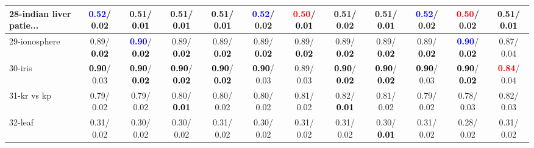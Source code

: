 \begin{table}[h]
\begin{center}
{\begin{tabular}{lc|c|c|c|c|c|c|c|c|c|c}
28-indian liver patie... & \textcolor{blue}{\textbf{  0.52}}/  0.02 &   0.51/\textcolor{black}{\textbf{  0.01}} &   0.51/\textcolor{black}{\textbf{  0.01}} &   0.51/\textcolor{black}{\textbf{  0.01}} & \textcolor{blue}{\textbf{  0.52}}/  0.02 & \textcolor{red}{\textbf{  0.50}}/\textcolor{black}{\textbf{  0.01}} &   0.51/  0.02 &   0.51/\textcolor{black}{\textbf{  0.01}} & \textcolor{blue}{\textbf{  0.52}}/  0.02 & \textcolor{red}{\textbf{  0.50}}/  0.02 &   0.51/\textcolor{black}{\textbf{  0.01}} \\ \hline
29-ionosphere &   0.89/\textcolor{black}{\textbf{  0.02}} & \textcolor{blue}{\textbf{  0.90}}/\textcolor{black}{\textbf{  0.02}} &   0.89/\textcolor{black}{\textbf{  0.02}} &   0.89/\textcolor{black}{\textbf{  0.02}} &   0.89/\textcolor{black}{\textbf{  0.02}} &   0.89/\textcolor{black}{\textbf{  0.02}} &   0.89/\textcolor{black}{\textbf{  0.02}} &   0.89/\textcolor{black}{\textbf{  0.02}} &   0.89/\textcolor{black}{\textbf{  0.02}} & \textcolor{blue}{\textbf{  0.90}}/\textcolor{black}{\textbf{  0.02}} &   0.87/  0.04 \\
30-iris & \textcolor{black}{\textbf{  0.90}}/  0.03 & \textcolor{black}{\textbf{  0.90}}/\textcolor{black}{\textbf{  0.02}} & \textcolor{black}{\textbf{  0.90}}/\textcolor{black}{\textbf{  0.02}} & \textcolor{black}{\textbf{  0.90}}/\textcolor{black}{\textbf{  0.02}} & \textcolor{black}{\textbf{  0.90}}/  0.03 &   0.89/  0.03 & \textcolor{black}{\textbf{  0.90}}/\textcolor{black}{\textbf{  0.02}} & \textcolor{black}{\textbf{  0.90}}/\textcolor{black}{\textbf{  0.02}} & \textcolor{black}{\textbf{  0.90}}/  0.03 & \textcolor{black}{\textbf{  0.90}}/\textcolor{black}{\textbf{  0.02}} & \textcolor{red}{\textbf{  0.84}}/  0.04 \\
31-kr vs kp &   0.79/  0.02 &   0.79/  0.02 &   0.80/\textcolor{black}{\textbf{  0.01}} &   0.80/  0.02 &   0.80/  0.02 &   0.81/  0.02 &   0.82/\textcolor{black}{\textbf{  0.01}} &   0.81/  0.02 &   0.79/  0.02 &   0.78/  0.03 &   0.82/  0.03 \\
32-leaf &   0.31/  0.02 &   0.30/  0.02 &   0.30/  0.02 &   0.31/  0.02 &   0.30/  0.02 &   0.31/  0.02 &   0.31/  0.02 &   0.30/\textcolor{black}{\textbf{  0.01}} &   0.31/  0.02 &   0.28/  0.02 &   0.31/  0.02 \\\end{tabular}
}\label{strats0aSVM}
\end{center}
\end{table}
